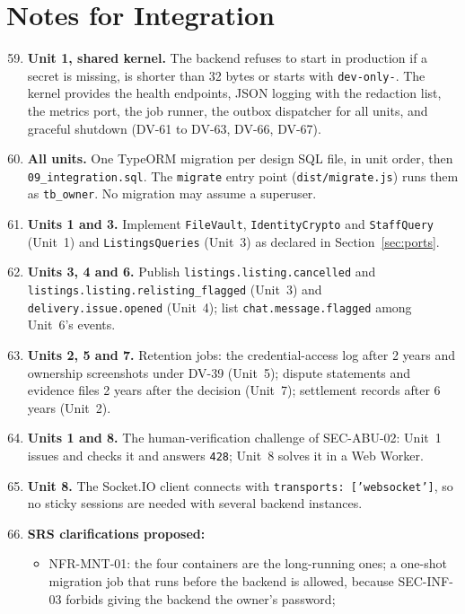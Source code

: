 \documentclass[11pt,a4paper]{article}
\begin{document}
\section{Notes for Integration}
\label{sec:notes}
\begin{enumerate}[label=\textbf{I-\arabic*}, leftmargin=*, nosep]
  \setcounter{enumi}{58}
  \item \textbf{Unit 1, shared kernel.} The backend refuses to start in production if a secret is missing, is shorter than 32 bytes or starts with \texttt{dev-only-}. The kernel provides the health endpoints, JSON logging with the redaction list, the metrics port, the job runner, the outbox dispatcher for all units, and graceful shutdown (DV-61 to DV-63, DV-66, DV-67).
  \item \textbf{All units.} One TypeORM migration per design SQL file, in unit order, then \texttt{09\_\allowbreak integration.\allowbreak sql}. The \texttt{migrate} entry point (\texttt{dist/migrate.\allowbreak js}) runs them as \texttt{tb\_owner}. No migration may assume a superuser.
  \item \textbf{Units 1 and 3.} Implement \texttt{FileVault}, \texttt{IdentityCrypto} and \texttt{StaffQuery} (Unit~1) and \texttt{ListingsQueries} (Unit~3) as declared in Section~\ref{sec:ports}.
  \item \textbf{Units 3, 4 and 6.} Publish \texttt{listings.\allowbreak listing.\allowbreak cancelled} and \texttt{listings.\allowbreak listing.\allowbreak relisting\_\allowbreak flagged} (Unit~3) and \texttt{delivery.\allowbreak issue.\allowbreak opened} (Unit~4); list \texttt{chat.\allowbreak message.\allowbreak flagged} among Unit~6's events.
  \item \textbf{Units 2, 5 and 7.} Retention jobs: the credential-access log after 2 years and ownership screenshots under DV-39 (Unit~5); dispute statements and evidence files 2 years after the decision (Unit~7); settlement records after 6 years (Unit~2).
  \item \textbf{Units 1 and 8.} The human-verification challenge of SEC-ABU-02: Unit~1 issues and checks it and answers \texttt{428}; Unit~8 solves it in a Web Worker.
  \item \textbf{Unit 8.} The Socket.IO client connects with \texttt{transports: ['websocket']}, so no sticky sessions are needed with several backend instances.
  \item \textbf{SRS clarifications proposed:}
  \begin{itemize}[nosep]
    \item NFR-MNT-01: the four containers are the long-running ones; a one-shot migration job that runs before the backend is allowed, because SEC-INF-03 forbids giving the backend the owner's password;

\end{itemize}
\end{enumerate}
\end{document}
